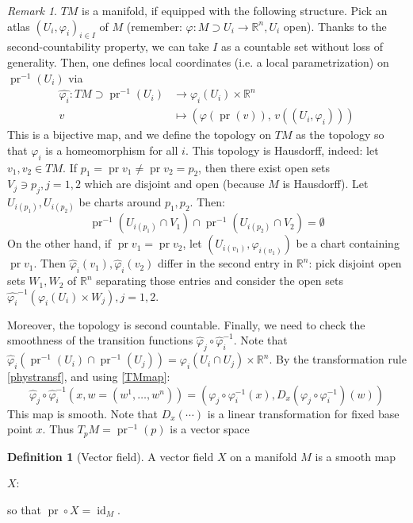 \documentclass[a4paper,11pt,titlepage, article, oneside]{memoir}
\numberwithin{equation}{section}
\theoremstyle{definition}
\newtheorem{definition}[theorem]{Definition}
\theoremstyle{remark}
\newtheorem{remark}[theorem]{Remark}
\DeclareMathOperator{\id}{id}
\DeclareMathOperator{\pr}{pr}
\newcommand{\rfield}{\mathbb{R}}
\begin{document}
\begin{remarkbox}\begin{remark}
$TM$ is a manifold, if equipped with the following structure. Pick an atlas $(U_i, \varphi_i)_{i \in I}$ of $M$ (remember: $\varphi \colon M \supset U_i \rightarrow \rfield^n, U_i$ open). Thanks to the second-countability property, we can take $I$ as a countable set without loss of generality. Then, one defines local coordinates (i.e. a local parametrization) on $\pr^{-1}(U_i)$ via
\begin{align} \label{TMmap}
\hat{\varphi_i} \colon TM \supset \pr^{-1}(U_i) &\longrightarrow \varphi_i(U_i) \times \rfield^n \\
v &\longmapsto \left ( \varphi(\pr(v)),\, v((U_i, \varphi_i)) \right ) \nonumber
\end{align}
This is a bijective map, and we define the topology on $TM$ as the topology so that $\hat{\varphi_i}$ is a homeomorphism for all $i$. This topology is Hausdorff, indeed: let $v_1, v_2 \in TM$. If $p_1 = \pr v_1 \not = \pr v_2 = p_2$, then there exist open sets $V_j \ni p_j, j =1, 2$ which are disjoint and open (because $M$ is Hausdorff). Let $U_{i(p_1)}, U_{i(p_2)}$ be charts around $p_1, p_2$. Then:
$$\pr^{-1} \left( U_{i(p_1)} \cap V_1 \right) \cap \pr^{-1} \left( U_{i(p_2)} \cap V_2 \right) = \emptyset$$
On the other hand, if $\pr v_1 = \pr v_2$, let $\left( U_{i(v_1)}, \varphi_{i(v_1)} \right)$ be a chart containing $\pr v_1$. Then $\hat \varphi_i(v_1), \hat \varphi_i (v_2)$ differ in the second entry in $\rfield^n$: pick disjoint open sets $W_1, W_2$ of $\rfield^n$ separating those entries and consider the open sets $\hat{\varphi_i}^{-1} \left( \varphi_i(U_i) \times W_j \right), j =1, 2$.

Moreover, the topology is second countable. Finally, we need to check the smoothness of the transition functions $\hat \varphi_j \circ \hat \varphi_i^{-1}$. Note that $\hat \varphi_i \left( \pr^{-1}(U_i) \cap \pr^{-1}(U_j) \right) = \varphi_i (U_i \cap U_j) \times \rfield^n$. By the transformation rule \eqref{phystransf}, and using \eqref{TMmap}:
$$\hat \varphi_j \circ \hat \varphi_i^{-1} \left (x, w = (w^1, \ldots, w^n) \right) = (\varphi_j \circ \varphi_i^{-1}(x), D_x(\varphi_j \circ \varphi_i^{-1}) (w))$$
This map is smooth. Note that $D_x(\cdots)$ is a linear transformation for fixed base point $x$. 
Thus $ T_pM = \pr^{-1}(p)$ is a vector space
\end{remark}\end{remarkbox}

\begin{definition}[Vector field]
A vector field $X$ on a manifold $M$ is a smooth map
\begin{center}
$X \colon$
\end{center}
so that $\pr \circ X = \id_M$.
\end{definition}
\end{document}
